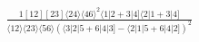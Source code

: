 \documentclass[varwidth, border=5pt]{standalone}
\begin{document}
\begin{my}
$\begin{gathered}
\scriptscriptstyle\frac{1[12][23]⟨24⟩⟨46⟩^2⟨1|2+3|4]⟨2|1+3|4]}{⟨12⟩⟨23⟩⟨56⟩(⟨3|2|5+6|4|3]-⟨2|1|5+6|4|2])^2}
\end{gathered}$
\end{my}
\end{document}

